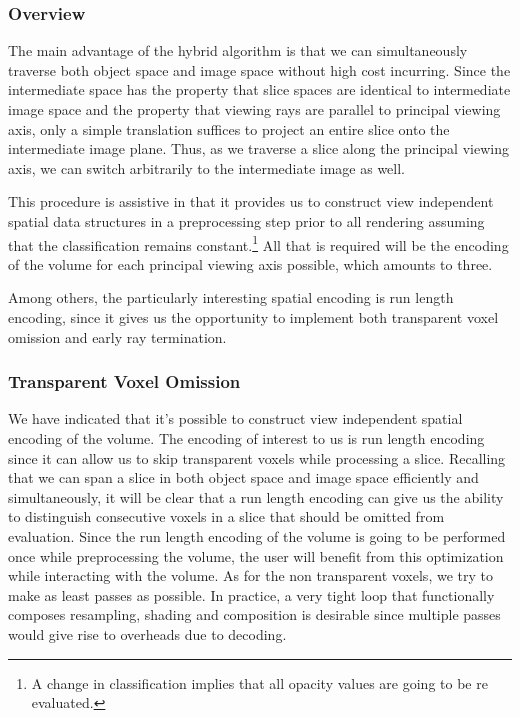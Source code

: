 \documentclass[a4paper,12pt]{article}
\begin{document}
\subsubsection{Overview}

The main advantage of the hybrid algorithm is that we can
simultaneously traverse both object space and image space without high
cost incurring. Since the intermediate space has the property that
slice spaces are identical to intermediate image space and the
property that viewing rays are parallel to principal viewing axis,
only a simple translation suffices to project an entire slice onto the
intermediate image plane. Thus, as we traverse a slice along the
principal viewing axis, we can switch arbitrarily to the intermediate
image as well.

This procedure is assistive in that it provides us to construct view
independent spatial data structures in a preprocessing step prior to
all rendering assuming that the classification remains
constant.\footnote{A change in classification implies that all opacity
  values are going to be re evaluated.} All that is required will be
the encoding of the volume for each principal viewing axis possible,
which amounts to three.

Among others, the particularly interesting spatial encoding is run
length encoding, since it gives us the opportunity to implement both
transparent voxel omission and early ray termination.

\subsubsection{Transparent Voxel Omission}

We have indicated that it's possible to construct view independent
spatial encoding of the volume. The encoding of interest to us is run
length encoding since it can allow us to skip transparent voxels while
processing a slice. Recalling that we can span a slice in both object
space and image space efficiently and simultaneously, it will be clear
that a run length encoding can give us the ability to distinguish
consecutive voxels in a slice that should be omitted from evaluation.
Since the run length encoding of the volume is going to be performed
once while preprocessing the volume, the user will benefit from this
optimization while interacting with the volume. As for the non
transparent voxels, we try to make as least passes as possible. In
practice, a very tight loop that functionally composes resampling,
shading and composition is desirable since multiple passes would give
rise to overheads due to decoding.
\end{document}

